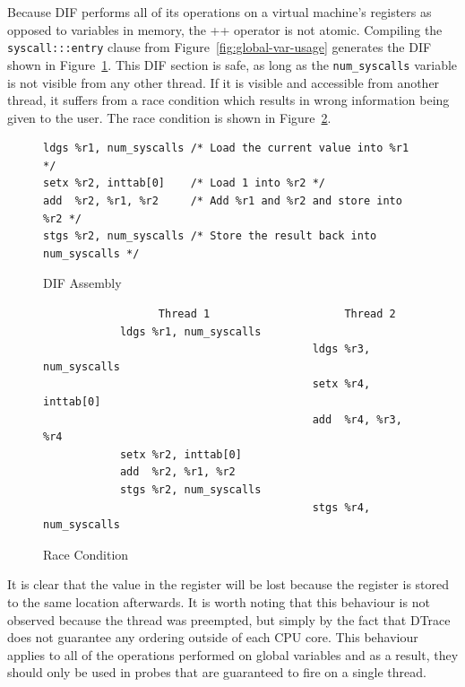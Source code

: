 \noindent
Because DIF performs all of its operations on a virtual machine's
registers as opposed to variables in memory, the ++ operator is not
atomic. Compiling the \texttt{syscall:::entry} clause from
Figure~\ref{fig:global-var-usage} generates the DIF shown in
Figure~\ref{fig:dif-asm}.  This DIF section is safe, as long as the
\texttt{num\_syscalls} variable is not visible from any other thread. If it is
visible and accessible from another thread, it suffers from a race
condition which results in wrong information being given to the
user. The race condition is shown in Figure~\ref{fig:race}. \newline

\begin{figure}
\begin{lstlisting}
ldgs %r1, num_syscalls /* Load the current value into %r1 */
setx %r2, inttab[0]    /* Load 1 into %r2 */
add  %r2, %r1, %r2     /* Add %r1 and %r2 and store into %r2 */
stgs %r2, num_syscalls /* Store the result back into num_syscalls */
\end{lstlisting}
\caption{DIF Assembly}
  \label{fig:dif-asm}
\end{figure}

\begin{figure}
  \begin{lstlisting}
                  Thread 1                     Thread 2
            ldgs %r1, num_syscalls
                                          ldgs %r3, num_syscalls
                                          setx %r4, inttab[0]
                                          add  %r4, %r3, %r4
            setx %r2, inttab[0]
            add  %r2, %r1, %r2
            stgs %r2, num_syscalls
                                          stgs %r4, num_syscalls
  \end{lstlisting}
  \caption{Race Condition}
  \label{fig:race}
\end{figure}

\noindent
It is clear that the value in the  register will be lost because
the register  is stored to the same location afterwards. It is
worth noting that this behaviour is not observed because the thread was
preempted, but simply by the fact that DTrace does not guarantee any ordering
outside of each CPU core. This behaviour applies to all of the operations
performed on global variables and as a result, they should only be used in
probes that are guaranteed to fire on a single thread. \newline

